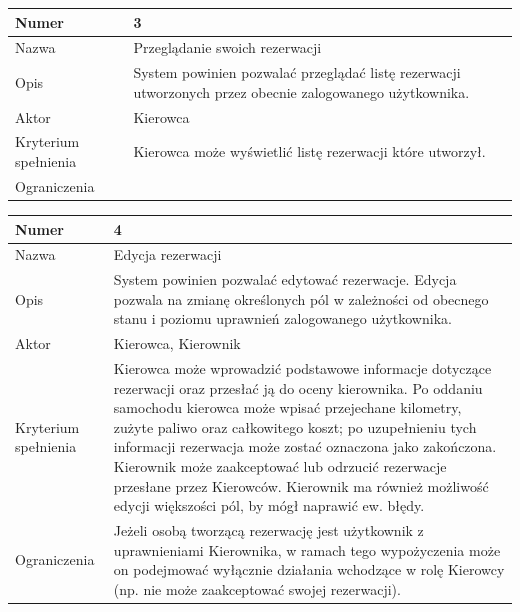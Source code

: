 \documentclass[eng,printmode,openany]{mgr}
\begin{document}
	\begin{table}[H]
		\begin{tabularx}{\textwidth}{|l|X|}
			\hline
			Numer                & 3  \\ \hline
			Nazwa                & Przeglądanie swoich rezerwacji \\ \hline
			Opis                 & System powinien pozwalać przeglądać listę rezerwacji utworzonych przez obecnie zalogowanego użytkownika. \\ \hline
			Aktor                & Kierowca \\ \hline
			Kryterium spełnienia & Kierowca może wyświetlić listę rezerwacji które utworzył. \\ \hline
			Ograniczenia         &  \\ \hline
		\end{tabularx}
	\end{table}

	\begin{table}[H]
		\begin{tabularx}{\textwidth}{|l|X|}
			\hline
			Numer                & 4  \\ \hline
			Nazwa                & Edycja rezerwacji\\ \hline
			Opis                 & System powinien pozwalać edytować rezerwacje. Edycja pozwala na zmianę określonych pól w zależności od obecnego stanu i poziomu uprawnień zalogowanego użytkownika. \\ \hline
			Aktor                & Kierowca, Kierownik \\ \hline
			Kryterium spełnienia & Kierowca może wprowadzić podstawowe informacje dotyczące rezerwacji oraz przesłać ją do oceny kierownika. Po oddaniu samochodu kierowca może wpisać przejechane kilometry, zużyte paliwo oraz całkowitego koszt; po uzupełnieniu tych informacji rezerwacja może zostać oznaczona jako zakończona. Kierownik może zaakceptować lub odrzucić rezerwacje przesłane przez Kierowców. Kierownik ma również możliwość edycji większości pól, by mógł naprawić ew. błędy. \\ \hline
			Ograniczenia         & Jeżeli osobą tworzącą rezerwację jest użytkownik z uprawnieniami Kierownika, w ramach tego wypożyczenia może on podejmować wyłącznie działania wchodzące w rolę Kierowcy (np. nie może zaakceptować swojej rezerwacji). \\ \hline
		\end{tabularx}
	\end{table}
\end{document}
